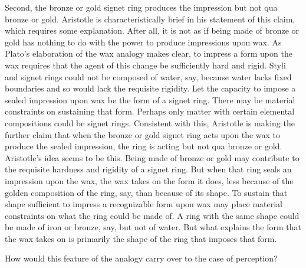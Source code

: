 Second, the bronze or gold signet ring produces the impression but not qua bronze or gold. Aristotle is characteristically brief in his statement of this claim, which requires some explanation. After all, it is not as if being made of bronze or gold has nothing to do with the power to produce impressions upon wax. As Plato's elaboration of the wax analogy makes clear, to impress a form upon the wax requires that the agent of this change be sufficiently hard and rigid. Styli and signet rings could not be composed of water, say, because water lacks fixed boundaries and so would lack the requisite rigidity. Let the capacity to impose a sealed impression upon wax be the form of a signet ring. There may be material constraints on sustaining that form. Perhaps only matter with certain elemental compositions could be signet rings. Consistent with this, Aristotle is making the further claim that when the bronze or gold signet ring acts upon the wax to produce the sealed impression, the ring is acting but not qua bronze or gold. Aristotle's idea seems to be this. Being made of bronze or gold may contribute to the requisite hardness and rigidity of a signet ring. But when that ring seals an impression upon the wax, the wax takes on the form it does, less because of the golden composition of the ring, say, than because of its shape. To sustain that shape sufficient to impress a recognizable form upon wax may place material constraints on what the ring could be made of. A ring with the same shape could be made of iron or bronze, say, but not of water. But what explains the form that the wax takes on is primarily the shape of the ring that imposes that form.

How would this feature of the analogy carry over to the case of perception?

